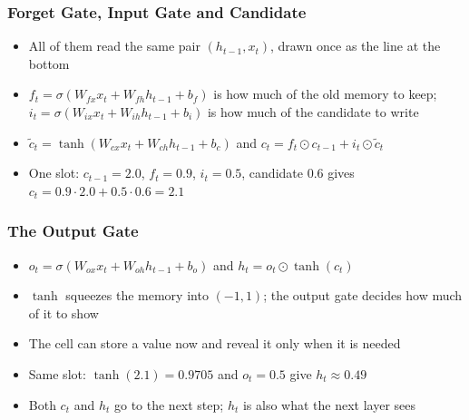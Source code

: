 \begin{frame}[fragile] \frametitle{Forget Gate, Input Gate and Candidate}
\begin{center}
\end{center}
\begin{itemize}
\item All of them read the same pair $(h_{t-1}, x_t)$, drawn once as the line at the bottom
\item $f_t = \sigma(W_{fx}x_t + W_{fh}h_{t-1} + b_f)$ is how much of the old memory to keep; $i_t = \sigma(W_{ix}x_t + W_{ih}h_{t-1} + b_i)$ is how much of the candidate to write
\item $\tilde{c}_t = \tanh(W_{cx}x_t + W_{ch}h_{t-1} + b_c)$ and $c_t = f_t \odot c_{t-1} + i_t \odot \tilde{c}_t$
\item One slot: $c_{t-1} = 2.0$, $f_t = 0.9$, $i_t = 0.5$, candidate $0.6$ gives $c_t = 0.9 \cdot 2.0 + 0.5 \cdot 0.6 = 2.1$
\end{itemize}
\end{frame}


\begin{frame}[fragile] \frametitle{The Output Gate}
\begin{center}
\end{center}
\begin{itemize}
\item $o_t = \sigma(W_{ox}x_t + W_{oh}h_{t-1} + b_o)$ and $h_t = o_t \odot \tanh(c_t)$
\item $\tanh$ squeezes the memory into $(-1, 1)$; the output gate decides how much of it to show
\item The cell can store a value now and reveal it only when it is needed
\item Same slot: $\tanh(2.1) = 0.9705$ and $o_t = 0.5$ give $h_t \approx 0.49$
\item Both $c_t$ and $h_t$ go to the next step; $h_t$ is also what the next layer sees
\end{itemize}
\end{frame}



